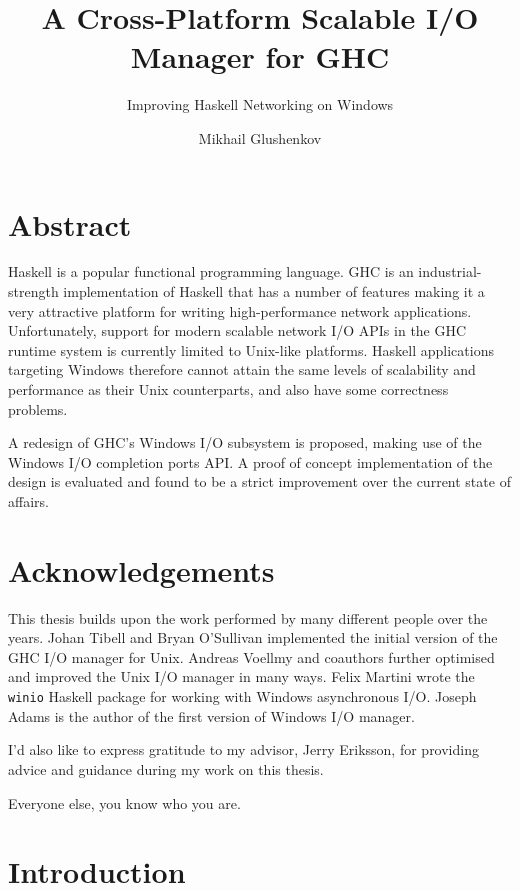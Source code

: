 \documentclass[a4paper,11pt,oneside]{report}
\title{A Cross-Platform Scalable I/O Manager for GHC}
\subtitle{Improving Haskell Networking on Windows}
\author{Mikhail Glushenkov}
\begin{document}
\maketitle

\chapter*{Abstract}

Haskell is a popular functional programming language. GHC is an
industrial-strength implementation of Haskell that has a number of features
making it a very attractive platform for writing high-performance network
applications. Unfortunately, support for modern scalable network I/O APIs in the
GHC runtime system is currently limited to Unix-like platforms. Haskell
applications targeting Windows therefore cannot attain the same levels of
scalability and performance as their Unix counterparts, and also have some
correctness problems.

A redesign of GHC's Windows I/O subsystem is proposed, making use of the Windows
I/O completion ports API. A proof of concept implementation of the design is
evaluated and found to be a strict improvement over the current state of
affairs.

\pagebreak

\chapter*{Acknowledgements}

This thesis builds upon the work performed by many different people over the
years. Johan Tibell and Bryan O'Sullivan implemented the initial version of the
GHC I/O manager for Unix. Andreas Voellmy and coauthors further optimised and
improved the Unix I/O manager in many ways. Felix Martini wrote the
\texttt{winio} Haskell package for working with Windows asynchronous I/O. Joseph
Adams is the author of the first version of Windows I/O manager.

I'd also like to express gratitude to my advisor, Jerry Eriksson, for providing
advice and guidance during my work on this thesis.

Everyone else, you know who you are.

\pagebreak


\tableofcontents

\pagebreak

\pagestyle{fancy}
\setcounter{page}{1}
\setcounter{chapter}{-1}

\chapter{Introduction}
\end{document}
